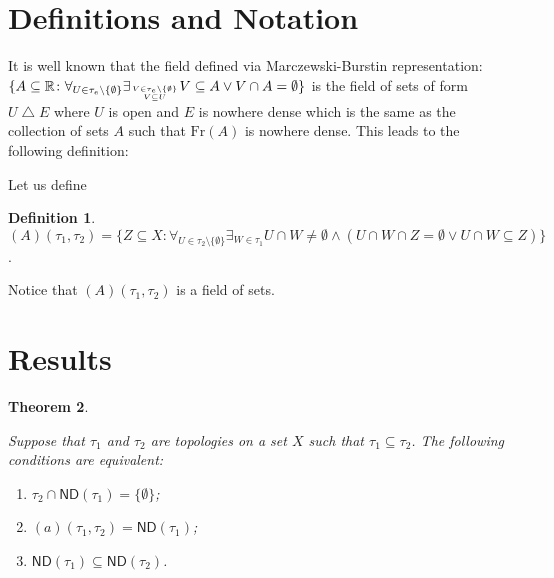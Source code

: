 \documentclass[12pt]{amsart}
\theoremstyle{plain}
\newtheorem{theorem}{Theorem}[section]
\theoremstyle{definition}
\newtheorem{definition}[theorem]{Definition}
\theoremstyle{remark}
\newcommand{\real}{\mathbb{R}}
\newcommand{\cK}{{\mathcal K}}
\newcommand{\mathint}{\mathit{int}}
\newcommand{\aideal}{\mathit{(a)}}
\newcommand{\Afield}{\mathit{(A)}}
\begin{document}
\section{Definitions and Notation}

It is well known that the field defined via
Marczewski-Burstin representation:
$\lbrace A \subseteq \real\colon 
\forall_{U \in \tau_e \setminus \lbrace \emptyset \rbrace}
\exists_{V \in \tau_e \setminus \lbrace \emptyset \rbrace \atop V \subseteq U}
V \subseteq A \vee V \cap A = \emptyset\rbrace$
is the field of sets of form $U \bigtriangleup E$
where $U$ is open and $E$ is nowhere dense
which is the same as the collection of sets $A$ such that
$\mathrm{Fr}(A)$ is nowhere dense.
This leads to the following definition:

Let us define 
\begin{definition}
$\Afield(\tau_1, \tau_2) = \{ Z \subseteq X \colon
\forall_{U \in \tau_2 \setminus \{ \emptyset\}}
\exists_{W \in \tau_1} U \cap W \not= \emptyset \wedge
(U \cap W \cap Z = \emptyset \vee U \cap W \subseteq Z)\}$.
\end{definition}

Notice that $\Afield(\tau_1, \tau_2)$ is a field of sets.

\section{Results}

\begin{theorem}
\label{collapse-theorem}

Suppose that $\tau_1$ and $\tau_2$ are topologies on a set $X$ such
that $\tau_1 \subseteq \tau_2$.
The following conditions are equivalent:
\begin{enumerate}
\item $\tau_2 \cap \mathsf{ND}(\tau_1) = \lbrace \emptyset \rbrace$;
\item $\aideal(\tau_1, \tau_2) = \mathsf{ND}(\tau_1)$;
\item $\mathsf{ND}(\tau_1) \subseteq \mathsf{ND}(\tau_2)$.
\end{enumerate}
\end{theorem}
									
\end{document}
